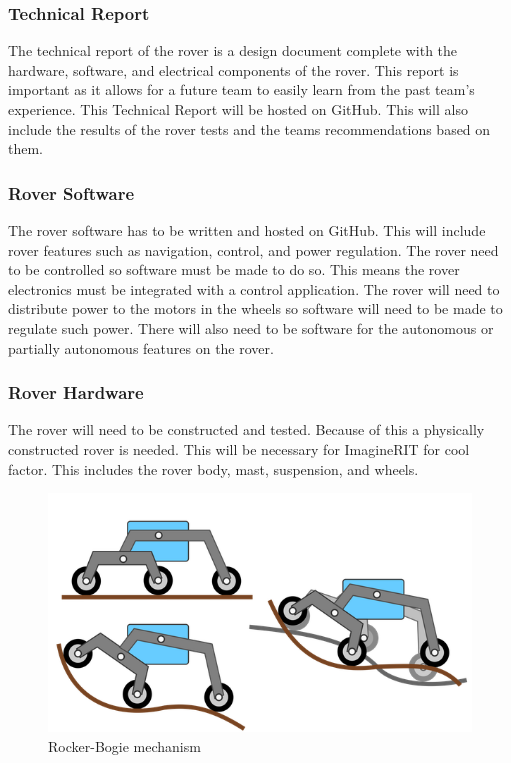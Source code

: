 \documentclass[conference]{IEEEtran} %
\begin{document}
\subsubsection{Technical Report}
\label{techreport}
The technical report of the rover is a design document complete with the hardware, software, and electrical components of the rover. This report is important as it allows for a future team to easily learn from the past team's experience. This Technical Report will be hosted on GitHub. This will also include the results of the rover tests and the teams recommendations  based on them. 

\subsubsection{Rover Software}
\label{roversoftware}
The rover software has to be written and hosted on GitHub. This will include rover features such as navigation, control, and power regulation. The rover need to be controlled so software must be made to do so. This means the rover electronics must be integrated with a control application. The rover will need to distribute power to the motors in the wheels so software will need to be made to regulate such power. There will also need to be software for the autonomous or partially autonomous features on the rover. 

\subsubsection{Rover Hardware}
\label{roverhardware}
The rover will need to be constructed and tested. Because of this a physically constructed rover is needed. This will be necessary for ImagineRIT for cool factor. This includes the rover body, mast, suspension, and wheels. 

\begin{figure}[ht!]
  \includegraphics[width=\linewidth]{figs/rocker-bogie.png}
  \caption{Rocker-Bogie mechanism}
\label{fig:lifecycle}
\end{figure}
\end{document}
